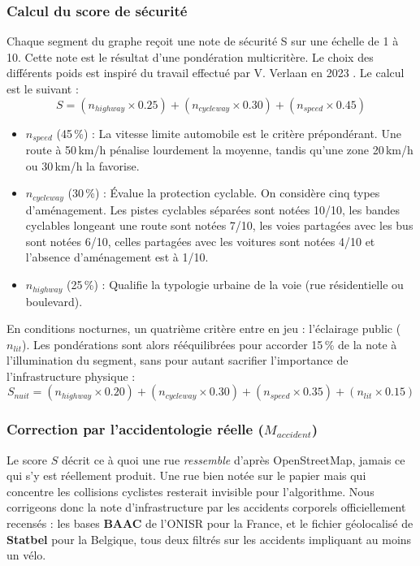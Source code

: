 \subsubsection{Calcul du score de sécurité}
\label{sec:calcul}
Chaque segment du graphe reçoit une note de sécurité S sur une échelle de 1 à 10. Cette note est le résultat d'une pondération multicritère. Le choix des différents poids est inspiré du travail effectué par V. Verlaan en 2023 \cite{StageVerlaan}.
Le calcul est le suivant :
\begin{equation}
S = (n_{highway} \times 0.25) + (n_{cycleway} \times 0.30) + (n_{speed} \times 0.45)
\end{equation}
\begin{itemize}
    \item $n_{speed}$ (45\,\%) : La vitesse limite automobile est le critère prépondérant. Une route à 50\,km/h pénalise lourdement la moyenne, tandis qu'une zone 20\,km/h ou 30\,km/h la favorise.
    \item $n_{cycleway}$ (30\,\%) : Évalue la protection cyclable. On considère cinq types d'aménagement. Les pistes cyclables séparées sont notées 10/10, les bandes cyclables longeant une route sont notées 7/10, les voies partagées avec les bus sont notées 6/10, celles partagées avec les voitures sont notées 4/10 et l'absence d'aménagement est à 1/10.
    \item $n_{highway}$ (25\,\%) : Qualifie la typologie urbaine de la voie (rue résidentielle ou boulevard).
\end{itemize}

En conditions nocturnes, un quatrième critère entre en jeu : l'éclairage public ($n_{lit}$). 
Les pondérations sont alors rééquilibrées pour accorder 15\,\% de la note à l'illumination du segment, sans pour autant sacrifier l'importance de l'infrastructure physique :
\begin{equation}
    S_{nuit} = (n_{highway} \times 0.20) + (n_{cycleway} \times 0.30) + (n_{speed} \times 0.35) + (n_{lit} \times 0.15)
\end{equation}

\subsubsection{Correction par l'accidentologie réelle ($M_{accident}$)}
\label{sec:accidentologie}

Le score $S$ décrit ce à quoi une rue \emph{ressemble} d'après OpenStreetMap, jamais ce qui s'y est réellement produit. Une rue bien notée sur le papier mais qui concentre les collisions cyclistes resterait invisible pour l'algorithme. Nous corrigeons donc la note d'infrastructure par les accidents corporels officiellement recensés : les bases \textbf{BAAC} de l'ONISR pour la France, et le fichier géolocalisé de \textbf{Statbel} pour la Belgique, tous deux filtrés sur les accidents impliquant au moins un vélo.


